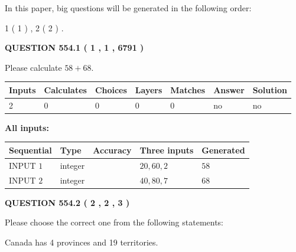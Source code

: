 \documentclass[12pt]{article}
\begin{document}
In this paper, big questions will be generated in the following order: 
   
   
   1 ( 1 )
 ,
   2 ( 2 )
 .
  
\vspace{0.2in}
  
{\textbf{\Large{QUESTION
554.1 
 ( 1 , 1 , 6791 )
}}}
  
  
 
Please calculate $ %
58 +  %
68 $.
 
 
   
   
   
   
\noindent\begin{tabular}{|l|l|l|l|l|l|l|}
 \hline
Inputs & Calculates & Choices & Layers & Matches & Answer & Solution \\ \hline
 2  & 
 0  & 
 0
  & 
 0  & 
 0  & 
  no & 
  no 
  \\ \hline
 \end{tabular}
   
   
   
   
\noindent{}
   
   
   
   
\noindent\vspace{0.1in}\hspace{-0.08in} {\textbf{\Large{All inputs: }}}
   
   
  
  
\noindent\begin{tabular}{|l|l|l|l|l|}
\hline
 Sequential & Type & Accuracy & Three inputs & Generated \\ 
\hline
 
 
  INPUT $  1 $ & integer &  & $
 20
 , 
 60
 , 
 2
 $ & $ 58 $ 
 \\  \hline  
 
 
  INPUT $  2 $ & integer &  & $
 40
 , 
 80
 , 
 7
 $ & $ 68 $ 
 \\  \hline  
 \end{tabular}
   
   
  
\vspace{0.2in}
  
{\textbf{\Large{QUESTION
554.2 
 ( 2 , 2 , 3 )
}}}
  
  
Please choose the correct one from the following statements:
 
 
Canada has   4 provinces and  19 territories.
 
\end{document}
